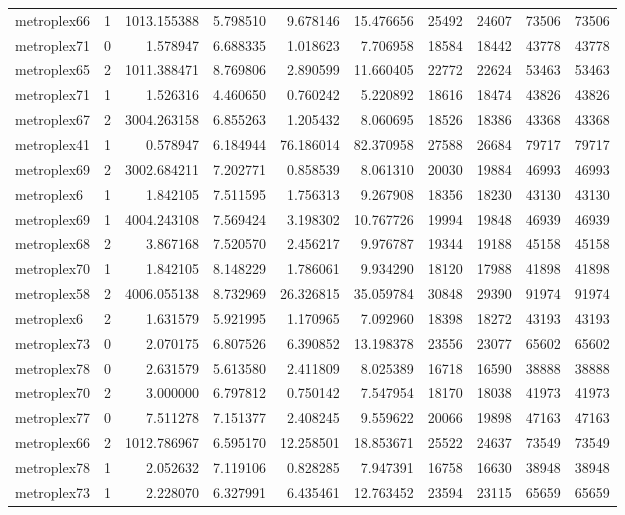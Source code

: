 \begin{longtable}{|l|r|r|r|r|r|r|r|r|r|}
metroplex66 & 1 & 1013.155388 & 5.798510 & 9.678146 & 15.476656 & 25492 & 24607 & 73506 & 73506 \\
metroplex71 & 0 & 1.578947 & 6.688335 & 1.018623 & 7.706958 & 18584 & 18442 & 43778 & 43778 \\
metroplex65 & 2 & 1011.388471 & 8.769806 & 2.890599 & 11.660405 & 22772 & 22624 & 53463 & 53463 \\
metroplex71 & 1 & 1.526316 & 4.460650 & 0.760242 & 5.220892 & 18616 & 18474 & 43826 & 43826 \\
metroplex67 & 2 & 3004.263158 & 6.855263 & 1.205432 & 8.060695 & 18526 & 18386 & 43368 & 43368 \\
metroplex41 & 1 & 0.578947 & 6.184944 & 76.186014 & 82.370958 & 27588 & 26684 & 79717 & 79717 \\
metroplex69 & 2 & 3002.684211 & 7.202771 & 0.858539 & 8.061310 & 20030 & 19884 & 46993 & 46993 \\
metroplex6 & 1 & 1.842105 & 7.511595 & 1.756313 & 9.267908 & 18356 & 18230 & 43130 & 43130 \\
metroplex69 & 1 & 4004.243108 & 7.569424 & 3.198302 & 10.767726 & 19994 & 19848 & 46939 & 46939 \\
metroplex68 & 2 & 3.867168 & 7.520570 & 2.456217 & 9.976787 & 19344 & 19188 & 45158 & 45158 \\
metroplex70 & 1 & 1.842105 & 8.148229 & 1.786061 & 9.934290 & 18120 & 17988 & 41898 & 41898 \\
metroplex58 & 2 & 4006.055138 & 8.732969 & 26.326815 & 35.059784 & 30848 & 29390 & 91974 & 91974 \\
metroplex6 & 2 & 1.631579 & 5.921995 & 1.170965 & 7.092960 & 18398 & 18272 & 43193 & 43193 \\
metroplex73 & 0 & 2.070175 & 6.807526 & 6.390852 & 13.198378 & 23556 & 23077 & 65602 & 65602 \\
metroplex78 & 0 & 2.631579 & 5.613580 & 2.411809 & 8.025389 & 16718 & 16590 & 38888 & 38888 \\
metroplex70 & 2 & 3.000000 & 6.797812 & 0.750142 & 7.547954 & 18170 & 18038 & 41973 & 41973 \\
metroplex77 & 0 & 7.511278 & 7.151377 & 2.408245 & 9.559622 & 20066 & 19898 & 47163 & 47163 \\
metroplex66 & 2 & 1012.786967 & 6.595170 & 12.258501 & 18.853671 & 25522 & 24637 & 73549 & 73549 \\
metroplex78 & 1 & 2.052632 & 7.119106 & 0.828285 & 7.947391 & 16758 & 16630 & 38948 & 38948 \\
metroplex73 & 1 & 2.228070 & 6.327991 & 6.435461 & 12.763452 & 23594 & 23115 & 65659 & 65659 \\

\end{longtable}
